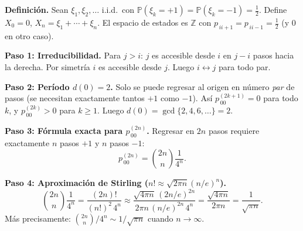 \documentclass[10pt,a4paper]{article}
\numberwithin{equation}{section}
\newcommand{\Prob}[1]{\mathbb{P}\!\left(#1\right)}
\newcommand{\pij}[2]{p_{\,#1#2}}                         %
\newcommand{\pijn}[3]{p_{\,#1#2}^{(#3)}}                 %
\newcounter{excount}[section]
\renewcommand{\theexcount}{\thesection.\arabic{excount}}
\newenvironment{ejemplo}[1]{%
  \refstepcounter{excount}%
  \begin{tcolorbox}[exbox, title={Ejemplo \theexcount\ \textperiodcentered\ #1}]%
}{\end{tcolorbox}}
\begin{document}
\begin{ejemplo}{Paseo aleatorio sim\'etrico en $\mathbb{Z}$}
  \textbf{Definici\'on.}
  Sean $\xi_1,\xi_2,\ldots$ i.i.d.\ con $\Prob{\xi_k=+1}=\Prob{\xi_k=-1}=\tfrac{1}{2}$.
  Define $X_0=0$, $X_n=\xi_1+\cdots+\xi_n$. El espacio de estados es $\mathbb{Z}$ con
  $\pij{i}{i+1}=\pij{i}{i-1}=\tfrac{1}{2}$ (y $0$ en otro caso).

  \begin{center}
  \end{center}

  \textbf{Paso 1: Irreducibilidad.}
  Para $j>i$: $j$ es accesible desde $i$ en $j-i$ pasos hacia la derecha.
  Por simetr\'ia $i$ es accesible desde $j$. Luego $i\leftrightarrow j$ para todo par.

  \textbf{Paso 2: Per\'iodo $d(0)=2$.}
  Solo se puede regresar al origen en n\'umero \emph{par} de pasos (se necesitan
  exactamente tantos $+1$ como $-1$). As\'i $\pijn{0}{0}{2k+1}=0$ para todo $k$, y
  $\pijn{0}{0}{2k}>0$ para $k\ge1$. Luego $d(0)=\gcd\{2,4,6,\ldots\}=2$.

  \textbf{Paso 3: F\'ormula exacta para $\pijn{0}{0}{2n}$.}
  Regresar en $2n$ pasos requiere exactamente $n$ pasos $+1$ y $n$ pasos $-1$:
  \[
    \pijn{0}{0}{2n} = \binom{2n}{n}\frac{1}{4^n}.
  \]

  \textbf{Paso 4: Aproximaci\'on de Stirling ($n!\approx\sqrt{2\pi n}(n/e)^n$).}
  \[
    \binom{2n}{n}\frac{1}{4^n}
    = \frac{(2n)!}{(n!)^2\,4^n}
    \approx \frac{\sqrt{4\pi n}\,(2n/e)^{2n}}{2\pi n\,(n/e)^{2n}\,4^n}
    = \frac{\sqrt{4\pi n}}{2\pi n} = \frac{1}{\sqrt{\pi n}}.
  \]
  M\'as precisamente: $\binom{2n}{n}/4^n\sim 1/\sqrt{\pi n}$ cuando $n\to\infty$.


\end{ejemplo}
\end{document}
